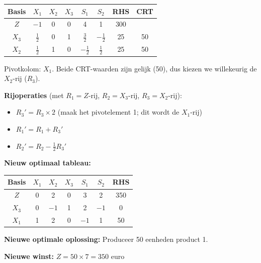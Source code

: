 \documentclass[a4paper,11pt]{article}
\begin{document}
\begin{oefenblok}
    \begin{center}
        \begin{tabular}{c|ccccc|c|c}
            \hline
            Basis & $X_1$         & $X_2$ & $X_3$ & $S_1$          & $S_2$          & RHS & CRT \\
            \hline
            $Z$   & $-1$          & 0     & 0     & 4              & 1              & 300 &     \\
            $X_3$ & $\frac{1}{2}$ & 0     & 1     & $\frac{3}{2}$  & $-\frac{1}{2}$ & 25  & 50  \\
            $X_2$ & $\frac{1}{2}$ & 1     & 0     & $-\frac{1}{2}$ & $\frac{1}{2}$  & 25  & 50  \\
            \hline
        \end{tabular}
    \end{center}

    Pivotkolom: $X_1$. Beide CRT-waarden zijn gelijk (50), dus kiezen we willekeurig de $X_2$-rij ($R_3$).

    \textbf{Rijoperaties} (met $R_1 = Z$-rij, $R_2 = X_3$-rij, $R_3 = X_2$-rij):
    \begin{itemize}
        \item $R_3' = R_3 \times 2$ (maak het pivotelement 1; dit wordt de $X_1$-rij)
        \item $R_1' = R_1 + R_3'$
        \item $R_2' = R_2 - \frac{1}{2}R_3'$
    \end{itemize}

    \textbf{Nieuw optimaal tableau:}

    \begin{center}
        \begin{tabular}{c|ccccc|c}
            \hline
            Basis & $X_1$ & $X_2$ & $X_3$ & $S_1$ & $S_2$ & RHS \\
            \hline
            $Z$   & 0     & 2     & 0     & 3     & 2     & 350 \\
            $X_3$ & 0     & $-1$  & 1     & 2     & $-1$  & 0   \\
            $X_1$ & 1     & 2     & 0     & $-1$  & 1     & 50  \\
            \hline
        \end{tabular}
    \end{center}

    \textbf{Nieuwe optimale oplossing:} Produceer 50 eenheden product 1.

    \textbf{Nieuwe winst:} $Z = 50 \times 7 = 350$ euro


\end{oefenblok}
\end{document}
